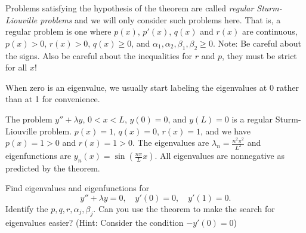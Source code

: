 \documentclass[12pt]{book}
\begin{document}
Problems satisfying the hypothesis of the
theorem are called
\emph{regular Sturm-Liouville problems}%
and we will only consider such problems here.
That is, a regular problem is one where
$p(x)$, $p'(x)$, $q(x)$ and $r(x)$ are continuous, $p(x) > 0$, $r(x) > 0$,
$q(x) \geq 0$, and $\alpha_1, \alpha_2, \beta_1, \beta_2 \geq 0$.
Note: Be careful about the signs.  Also be careful about the inequalities
for $r$ and $p$, they
must be strict for all $x$!

When zero
is an eigenvalue, we usually
start labeling the eigenvalues at 0 rather than at 1 for convenience.

\begin{example}
The problem $y''+\lambda y$, $0 < x < L$, $y(0) = 0$, and $y(L) = 0$
is a regular Sturm-Liouville problem.  $p(x) = 1$, $q(x) = 0$, $r(x) = 1$,
and we have $p(x) = 1 > 0$ and $r(x) = 1 > 0$.
The eigenvalues are $\lambda_n = \frac{n^2 \pi^2}{L^2}$ and eigenfunctions
are $y_n(x) = \sin(\frac{n\pi}{L} x)$.  All eigenvalues are nonnegative as
predicted by the theorem.
\end{example}

\begin{exercise}
Find eigenvalues and eigenfunctions for
\begin{equation*}
y'' + \lambda y = 0, \quad y'(0) = 0, \quad y'(1) = 0.
\end{equation*}
Identify
the $p, q, r, \alpha_j, \beta_j$.
Can you use the theorem to make the search for eigenvalues easier?
(Hint: Consider the condition $-y'(0)=0$)
\end{exercise}
\end{document}
